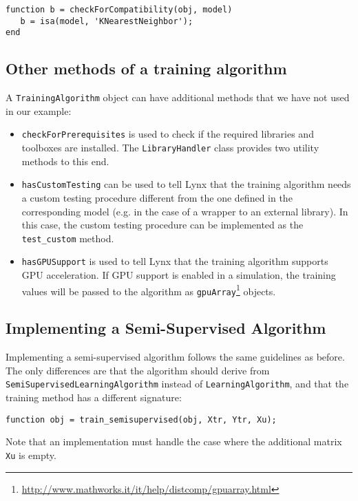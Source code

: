 \begin{lstlisting}
function b = checkForCompatibility(obj, model)
   b = isa(model, 'KNearestNeighbor');
end
\end{lstlisting}

\subsection{Other methods of a training algorithm}

A \verb|TrainingAlgorithm| object can have additional methods that we have not used in our example:

\begin{itemize}
\item \verb|checkForPrerequisites| is used to check if the required libraries and toolboxes are installed. The \verb|LibraryHandler| class provides two utility methods to this end.
\item \verb|hasCustomTesting| can be used to tell Lynx that the training algorithm needs a custom testing procedure different from the one defined in the corresponding model (e.g. in the case of a wrapper to an external library). In this case, the custom testing procedure can be implemented as the \verb|test_custom| method.
\item \verb|hasGPUSupport| is used to tell Lynx that the training algorithm supports GPU acceleration. If GPU support is enabled in a simulation, the training values will be passed to the algorithm as \verb|gpuArray|\footnote{\url{http://www.mathworks.it/it/help/distcomp/gpuarray.html}} objects.
\end{itemize}

\subsection{Implementing a Semi-Supervised Algorithm}

Implementing a semi-supervised algorithm follows the same guidelines as before. The only differences are that the algorithm should derive from \verb|SemiSupervisedLearningAlgorithm| instead of \verb|LearningAlgorithm|, and that the training method has a different signature:

\begin{lstlisting}
function obj = train_semisupervised(obj, Xtr, Ytr, Xu);
\end{lstlisting}

\noindent Note that an implementation must handle the case where the additional matrix \verb|Xu| is empty.

